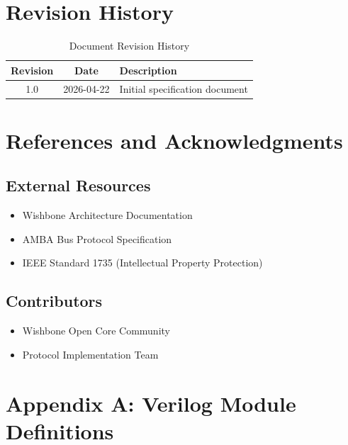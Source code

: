 \documentclass[12pt,a4paper]{article}
\begin{document}
\section{Revision History}

\begin{table}[H]
    \centering
    \begin{tabular}{|c|c|l|}
        \hline
        \textbf{Revision} & \textbf{Date} & \textbf{Description} \\
        \hline
        1.0 & 2026-04-22 & Initial specification document \\
        \hline
    \end{tabular}
    \caption{Document Revision History}
\end{table}

\section{References and Acknowledgments}

\subsection{External Resources}
\begin{itemize}
    \item Wishbone Architecture Documentation
    \item AMBA Bus Protocol Specification
    \item IEEE Standard 1735 (Intellectual Property Protection)
\end{itemize}

\subsection{Contributors}
\begin{itemize}
    \item Wishbone Open Core Community
    \item Protocol Implementation Team
\end{itemize}

\newpage
\appendix

\section{Appendix A: Verilog Module Definitions}
\end{document}
